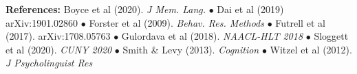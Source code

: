 \documentclass[11pt,a4paper]{article}
\begin{document}
\vspace{.1em}
	\begin{small}{
			\noindent\textbf{References:}
			Boyce et al (2020). \textit{J Mem. Lang.} $\bullet$
			Dai et al (2019) arXiv:1901.02860 $\bullet$
			Forster et al (2009). \textit{Behav. Res. Methods} $\bullet$
			Futrell et al (2017). arXiv:1708.05763 $\bullet$
			Gulordava et al (2018).  \textit{NAACL-HLT 2018} $\bullet$
			Sloggett et al (2020). \textit{CUNY 2020} $\bullet$
			Smith \& Levy (2013). \textit{Cognition} $\bullet$
			Witzel et al (2012).  \textit{J Psycholinguist Res} 
		}
	\end{small}
\end{document}
